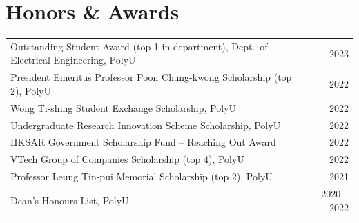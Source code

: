 \documentclass[11pt,letterpaper]{article}
\begin{document}
\section{Honors \& Awards}
\begin{tabularx}{\linewidth}{@{}X r@{}}
  Outstanding Student Award (top 1 in department), Dept.\ of Electrical Engineering, PolyU & 2023 \\
  President Emeritus Professor Poon Chung-kwong Scholarship (top 2), PolyU & 2022 \\
  Wong Ti-shing Student Exchange Scholarship, PolyU & 2022 \\
  Undergraduate Research Innovation Scheme Scholarship, PolyU & 2022 \\
  HKSAR Government Scholarship Fund -- Reaching Out Award & 2022 \\
  VTech Group of Companies Scholarship (top 4), PolyU & 2022 \\
  Professor Leung Tin-pui Memorial Scholarship (top 2), PolyU & 2021 \\
  Dean's Honours List, PolyU & 2020 -- 2022 \\
\end{tabularx}
\end{document}
